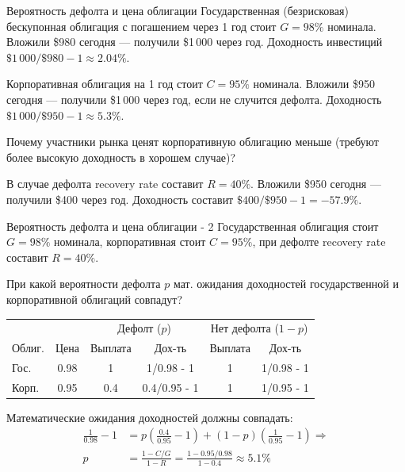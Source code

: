 \documentclass{beamer}
\begin{document}
\begin{frame}{Вероятность дефолта и цена облигации}
\justify
Государственная (безрисковая) бескупонная облигация с погашением через 1 год стоит $G=98\%$ номинала. Вложили \$980 сегодня --- получили \$1\,000 через год. Доходность инвестиций $\$1\,000 / \$980 - 1 \approx 2.04\%$.

\justify
Корпоративная облигация на 1 год стоит $C=95\%$ номинала. Вложили \$950 сегодня --- получили \$1\,000 через год, если не случится дефолта. Доходность $\$1\,000 / \$950 - 1 \approx 5.3\%$.

\justify
Почему участники рынка ценят корпоративную облигацию меньше (требуют более высокую доходность в хорошем случае)?

\justify
В случае дефолта recovery rate составит $R=40\%$. Вложили \$950 сегодня --- получили \$400 через год. Доходность составит $\$400 / \$950 - 1 = -57.9\%$.
\end{frame}



\begin{frame}{Вероятность дефолта и цена облигации - 2}
\justify
Государственная облигация стоит $G=98\%$ номинала, корпоративная стоит $C=95\%$, при дефолте recovery rate составит $R=40\%$.

\justify
При какой вероятности дефолта $p$ мат. ожидания доходностей государственной и корпоративной облигаций совпадут?

\centering
\begin{tabular}{l|c|c|c|c|c}
& & \multicolumn{2}{c|}{Дефолт ($p$)} & \multicolumn{2}{c}{Нет дефолта ($1-p$)} \\
Облиг. & Цена & Выплата & Дох-ть & Выплата & Дох-ть \\
\hline
Гос.  & 0.98 & 1     & 1/0.98 - 1 & 1 & 1/0.98 - 1\\
Корп. & 0.95 & 0.4 & 0.4/0.95 - 1 & 1 & 1/0.95 - 1
\end{tabular}

\justify
Математические ожидания доходностей должны совпадать:
\begin{align*}
\frac{1}{0.98} - 1 &= p\left(\frac{0.4}{0.95} - 1\right) + (1-p)\left(\frac{1}{0.95} - 1\right) \Rightarrow \\
p &= \frac{1 - C/G}{1-R} = \frac{1 - 0.95/0.98}{1-0.4} \approx 5.1\%
\end{align*}
\end{frame}
\end{document}
